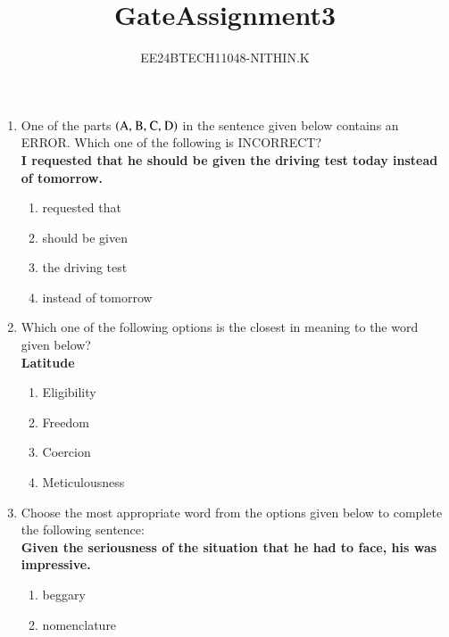 \documentclass[journal]{IEEEtran}
\numberwithin{equation}{enumi}
\numberwithin{figure}{enumi}
\begin{document}


\title{GateAssignment3}
\author{EE24BTECH11048-NITHIN.K} 
{\let\newpage\relax\maketitle}

\begin{enumerate}
\section{General Aptitude (GA) Questions(Compulsary)}
\item One of the parts $\left(\text{A, B, C, D}\right)$ in the sentence given below contains an ERROR. Which one of the following is INCORRECT? \\
	\textbf{I requested that he should be given the driving test today instead of tomorrow.}
		\begin{enumerate}
			\item requested that
			\item should be given
			\item the driving test
			\item instead of tomorrow
		\end{enumerate}
\item Which one of the following options is the closest in meaning to the word given below? \\
	\textbf{Latitude}
		\begin{enumerate}
			\item Eligibility
			\item Freedom
			\item Coercion
			\item Meticulousness
		\end{enumerate}
\item Choose the most appropriate word from the options given below to complete the following sentence: \\
	\textbf{Given the seriousness of the situation that he had to face, his \underline{\hspace{1cm}} was impressive.}
		\begin{enumerate}
			\item beggary
			\item nomenclature

\end{enumerate}
\end{enumerate}
\end{document}
